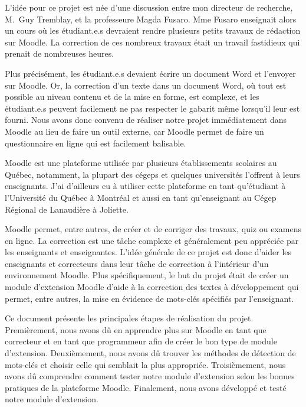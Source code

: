\begin{introduction}

L'id\'ee pour ce projet est n\'ee d'une discussion entre mon directeur de recherche, M.\ Guy Tremblay, et la professeure Magda Fusaro.
Mme Fusaro enseignait alors un cours o\`u les \'etudiant.e.s devraient rendre plusieurs petits travaux de r\'edaction sur Moodle.
La correction de ces nombreux travaux \'etait un travail fastidieux qui prenait de nombreuses heures.

Plus pr\'ecis\'ement, les \'etudiant.e.s devaient \'ecrire un document Word et l'envoyer sur Moodle.
Or, la correction d'un texte dans un document Word, o\`u tout est possible au niveau contenu et de la mise en forme, est complexe,  et les \'etudiant.e.s peuvent facilement ne pas respecter le gabarit m\^eme lorsqu'il leur est fourni.
Nous avons donc convenu de r\'ealiser notre projet imm\'ediatement dans Moodle au lieu de faire un outil externe, car Moodle permet de faire un questionnaire en ligne qui est facilement balisable.

Moodle est une plateforme utilisée par plusieurs établissements scolaires au Québec, notamment, la plupart des cégeps et quelques universités l'offrent à leurs enseignants.
J'ai d'ailleurs eu à utiliser cette plateforme en tant qu'étudiant à l'Université du Québec à Montréal et aussi en tant qu'enseignant au Cégep Régional de Lanaudière à Joliette.

Moodle permet, entre autres, de créer et de corriger des travaux, quiz ou examens en ligne.
La correction est une tâche complexe et g\'en\'eralement peu appréciée par les enseignants et enseignantes.
L'idée générale de ce projet est donc d'aider les enseignants et correcteurs dans leur tâche de correction à l'intérieur d'un environnement Moodle.
Plus sp\'ecifiquement, le but du projet \'etait de créer un module d'extension Moodle d'aide à la correction des textes à développement qui permet, entre autres, la mise en évidence de mots-clés sp\'ecifi\'es par l'enseignant.

Ce document pr\'esente les principales étapes de réalisation du projet.
Premièrement, nous avons d\^u en apprendre plus sur Moodle en tant que correcteur et en tant que programmeur afin de créer le bon type de module d'extension.
Deuxièmement, nous avons d\^u trouver les méthodes de détection de mots-clés et choisir celle qui semblait la plus appropri\'ee.
Troisièmement, nous avons d\^u comprendre comment tester notre module d'extension selon les bonnes pratiques de la plateforme Moodle.
Finalement, nous avons développ\'e et test\'e notre module d'extension.

\end{introduction}
